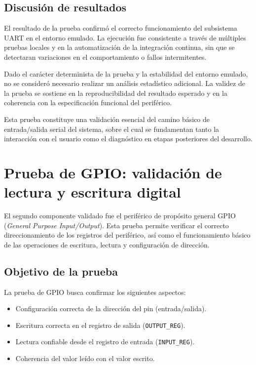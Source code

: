\vspace{1em}
\subsection*{Discusión de resultados}

El resultado de la prueba confirmó el correcto funcionamiento del subsistema UART en el entorno emulado. La ejecución fue consistente a través de múltiples pruebas locales y en la automatización de la integración continua, sin que se detectaran variaciones en el comportamiento o fallos intermitentes. 

Dado el carácter determinista de la prueba y la estabilidad del entorno emulado, no se consideró necesario realizar un análisis estadístico adicional. La validez de la prueba se sostiene en la reproducibilidad del resultado esperado y en la coherencia con la especificación funcional del periférico.

Esta prueba constituye una validación esencial del camino básico de entrada/salida serial del sistema, sobre el cual se fundamentan tanto la interacción con el usuario como el diagnóstico en etapas posteriores del desarrollo.

\section{Prueba de GPIO: validación de lectura y escritura digital}
\label{subsec:gpio-test}

El segundo componente validado fue el periférico de propósito general GPIO (\emph{General Purpose Input/Output}). Esta prueba permite verificar el correcto direccionamiento de los registros del periférico, así como el funcionamiento básico de las operaciones de escritura, lectura y configuración de dirección.

\subsection*{Objetivo de la prueba}

La prueba de GPIO busca confirmar los siguientes aspectos:

\begin{itemize}
    \item Configuración correcta de la dirección del pin (entrada/salida).
    \item Escritura correcta en el registro de salida (\texttt{OUTPUT\_REG}).
    \item Lectura confiable desde el registro de entrada (\texttt{INPUT\_REG}).
    \item Coherencia del valor leído con el valor escrito.
\end{itemize}

